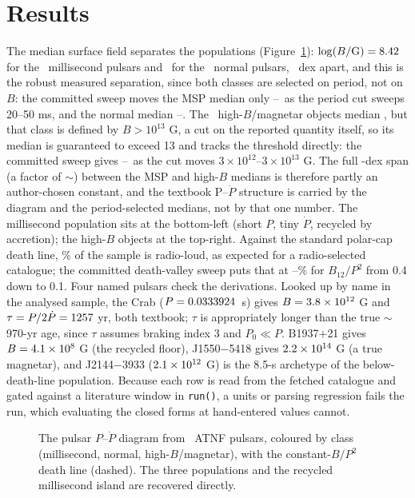 \documentclass[twocolumn]{aastex631}
\newcommand{\code}[1]{\texttt{#1}}
\begin{document}
\section{Results}
The median surface field separates the populations (Figure~\ref{fig:ppdot}):
$\log(B/\mathrm{G}) = 8.42$ for the \ppNmsp\ millisecond pulsars and \ppLogBnormal\ for the \ppNnormal\ normal pulsars, \ppMspNormalSpanDex\ dex apart, and this is the robust measured
separation, since both classes are selected on period, not on $B$: the committed sweep moves the
MSP median only \ppLogBmspTwentyMs--\ppLogBmspFiftyMs\ as the period cut sweeps 20--50 ms, and
the normal median \ppLogBnormalTwentyMs--\ppLogBnormalFiftyMs. The
\ppNmagnetar\ high-$B$/magnetar objects median \ppLogBmagnetar, but that class is defined by $B>10^{13}$ G, a cut on the reported quantity itself, so its median is guaranteed to
exceed 13 and tracks the threshold directly: the committed sweep gives
\ppLogBmagnetarLoCut--\ppLogBmagnetarHiCut\ as the cut moves $3\times10^{12}$--$3\times10^{13}$ G.
The full \ppBSpanDex-dex span (a factor of $\sim$\ppBSpanFactor) between the MSP and high-$B$
medians is therefore partly an author-chosen constant, and the textbook P--$\dot P$ structure
\citep{lorimerkramer2004} is carried by the diagram and the period-selected medians, not by that
one number. The millisecond population sits at the bottom-left (short $P$, tiny $\dot P$, recycled
by accretion); the high-$B$ objects at the top-right. Against the standard polar-cap death line,
\ppFracAlivePct\% of the sample is radio-loud, as expected for a radio-selected catalogue; the
committed death-valley sweep puts that at \ppFracAlivePctLo--\ppFracAlivePctHi\% for
$B_{12}/P^2$ from 0.4 down to 0.1. Four named pulsars check the derivations. Looked up by name in
the analysed sample, the Crab ($P=0.0333924$~s) gives $B=3.8\times10^{12}$ G and
$\tau=P/2\dot P=1257$ yr, both textbook; $\tau$ is appropriately longer than the true
$\sim$970-yr age, since $\tau$ assumes braking index 3 and $P_0\ll P$. B1937$+$21 gives
$B=4.1\times10^{8}$ G (the recycled floor), J1550$-$5418 gives $2.2\times10^{14}$ G (a true
magnetar), and J2144$-$3933 ($2.1\times10^{12}$ G) is the 8.5-s archetype of the below-death-line
population. Because each row is read from the fetched catalogue and gated against a literature
window in \code{run()}, a units or parsing regression fails the run, which evaluating the closed forms at hand-entered values cannot.

\begin{figure}
\caption{The pulsar $P$--$\dot P$ diagram from \ppN\ ATNF pulsars, coloured by class (millisecond,
normal, high-$B$/magnetar), with the constant-$B/P^2$ death line (dashed). The three populations and
the recycled millisecond island are recovered directly.}
\label{fig:ppdot}
\end{figure}
\end{document}
